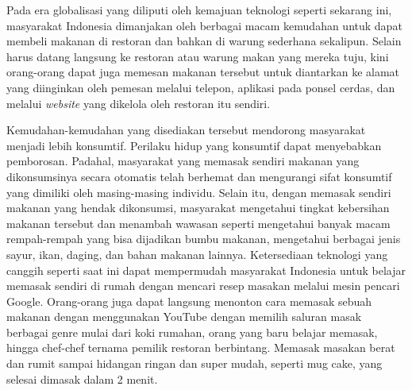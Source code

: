Pada era globalisasi yang diliputi oleh kemajuan teknologi seperti sekarang ini, masyarakat Indonesia dimanjakan oleh berbagai macam kemudahan untuk dapat membeli makanan di restoran dan bahkan di warung sederhana sekalipun. Selain harus datang langsung ke restoran atau warung makan yang mereka tuju, kini orang-orang dapat juga memesan makanan tersebut untuk diantarkan ke alamat yang diinginkan oleh pemesan melalui telepon, aplikasi pada ponsel cerdas, dan melalui \emph{website} yang dikelola oleh restoran itu sendiri. 

Kemudahan-kemudahan yang disediakan tersebut mendorong masyarakat menjadi lebih konsumtif. Perilaku hidup yang konsumtif dapat menyebabkan pemborosan. Padahal, masyarakat yang memasak sendiri makanan yang dikonsumsinya secara otomatis telah berhemat dan mengurangi sifat konsumtif yang dimiliki oleh masing-masing individu. Selain itu, dengan memasak sendiri makanan yang hendak dikonsumsi, masyarakat mengetahui tingkat kebersihan makanan tersebut dan menambah wawasan seperti mengetahui banyak macam rempah-rempah yang bisa dijadikan bumbu makanan, mengetahui berbagai jenis sayur, ikan, daging, dan bahan makanan lainnya. Ketersediaan teknologi yang canggih seperti saat ini dapat mempermudah masyarakat Indonesia untuk belajar memasak sendiri di rumah dengan mencari resep masakan melalui mesin pencari Google. Orang-orang juga dapat langsung menonton cara memasak sebuah makanan dengan menggunakan YouTube dengan memilih saluran masak berbagai genre mulai dari koki rumahan, orang yang baru belajar memasak, hingga chef-chef ternama pemilik restoran berbintang. Memasak masakan berat dan rumit sampai hidangan ringan dan super mudah, seperti mug cake, yang selesai dimasak dalam 2 menit.

